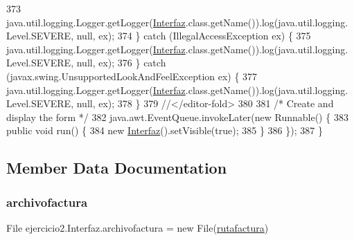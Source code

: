 \begin{DoxyCode}
373             java.util.logging.Logger.getLogger(\mbox{\hyperlink{namespace_interfaz}{Interfaz}}.class.getName()).log(java.util.logging.
      Level.SEVERE, null, ex);
374         \} \textcolor{keywordflow}{catch} (IllegalAccessException ex) \{
375             java.util.logging.Logger.getLogger(\mbox{\hyperlink{namespace_interfaz}{Interfaz}}.class.getName()).log(java.util.logging.
      Level.SEVERE, null, ex);
376         \} \textcolor{keywordflow}{catch} (javax.swing.UnsupportedLookAndFeelException ex) \{
377             java.util.logging.Logger.getLogger(\mbox{\hyperlink{namespace_interfaz}{Interfaz}}.class.getName()).log(java.util.logging.
      Level.SEVERE, null, ex);
378         \}
379         \textcolor{comment}{//</editor-fold>}
380 
381         \textcolor{comment}{/* Create and display the form */}
382         java.awt.EventQueue.invokeLater(\textcolor{keyword}{new} Runnable() \{
383             \textcolor{keyword}{public} \textcolor{keywordtype}{void} run() \{
384                 \textcolor{keyword}{new} \mbox{\hyperlink{classejercicio2_1_1_interfaz_a4fd3bce20b745d1b20a97b7ee776f843}{Interfaz}}().setVisible(\textcolor{keyword}{true});
385             \}
386         \});
387     \}
\end{DoxyCode}


\subsection{Member Data Documentation}
\mbox{\label{classejercicio2_1_1_interfaz_a897fa4f18ca280fa92941fdf25e8a1f1}} 
\subsubsection{\texorpdfstring{archivofactura}{archivofactura}}
{\footnotesize\ttfamily File ejercicio2.\+Interfaz.\+archivofactura = new File(\mbox{\hyperlink{classejercicio2_1_1_interfaz_ac6c007f1bd1ece3fb4e95ba1969daf82}{rutafactura}})\hspace{0.3cm}{\ttfamily [static]}}

\mbox{\label{classejercicio2_1_1_interfaz_aeeb42321ecdbd25ab4e98e6c2aee8022}} 
